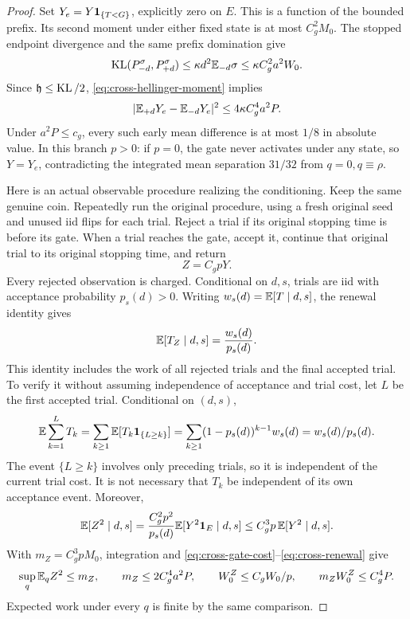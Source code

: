 \begin{proof}
Set \(Y_e=Y\mathbf 1_{\{T<G\}}\), explicitly zero on \(E\).
This is a function of the bounded prefix.
Its second moment under either fixed state is at most \(C_g^2M_0\).
The stopped endpoint divergence and the same prefix domination give
\[
 \operatorname{KL}(P_{-d}^{\sigma},P_{+d}^{\sigma})
 \le\kappa d^2\mathbb E_{-d}\sigma
 \le\kappa C_g^2a^2W_0.
\]
Since \(\mathfrak h\le\operatorname{KL}/2\), \eqref{eq:cross-hellinger-moment} implies
\begin{equation}
 |\mathbb E_{+d}Y_e-\mathbb E_{-d}Y_e|^2
 \le4\kappa C_g^4a^2P.
 \label{eq:cross-early-output}
\end{equation}
Under \(a^2P\le c_g\), every such early mean difference is at most
\(1/8\) in absolute value.  In this branch \(p>0\): if \(p=0\), the
gate never activates under any state, so \(Y=Y_e\), contradicting
the integrated mean separation \(31/32\) from \(q=0,q\equiv\rho\).

Here is an actual observable procedure realizing the conditioning.
Keep the same genuine coin.  Repeatedly run the original procedure,
using a fresh original seed and unused iid flips for each trial.
Reject a trial if its original stopping time is before its gate.
When a trial reaches the gate, accept it, continue that original trial
to its original stopping time, and return
\[
 Z=C_gpY.
\]
Every rejected observation is charged.  Conditional on \(d,s\), trials
are iid with acceptance probability \(p_s(d)>0\).
Writing \(w_s(d)=\mathbb E[T\mid d,s]\), the renewal identity gives
\begin{equation}
 \mathbb E[T_Z\mid d,s]=\frac{w_s(d)}{p_s(d)}.
 \label{eq:cross-renewal}
\end{equation}
This identity includes the work of all rejected trials and the final
accepted trial. To verify it without assuming independence of acceptance
and trial cost, let $L$ be the first accepted trial. Conditional on $(d,s)$,
\[
 \mathbb E\sum_{k=1}^{L}T_k
 =\sum_{k\ge1}\mathbb E[T_k\mathbf1_{\{L\ge k\}}]
 =\sum_{k\ge1}(1-p_s(d))^{k-1}w_s(d)
 =w_s(d)/p_s(d).
\]
The event $\{L\ge k\}$ involves only preceding trials, so it is independent
of the current trial cost. It is not necessary that $T_k$ be independent
of its own acceptance event. Moreover,
\[
 \mathbb E[Z^2\mid d,s]
 =\frac{C_g^2p^2}{p_s(d)}\mathbb E[Y^2\mathbf 1_E\mid d,s]
 \le C_g^3p\,\mathbb E[Y^2\mid d,s].
\]
With \(m_Z=C_g^3pM_0\), integration and
\eqref{eq:cross-gate-cost}--\eqref{eq:cross-renewal} give
\begin{equation}
 \sup_q\mathbb E_qZ^2\le m_Z,\qquad
 m_Z\le2C_g^4a^2P,\qquad
 W_0^Z\le C_gW_0/p,\qquad
 m_ZW_0^Z\le C_g^4P.
 \label{eq:cross-gate-moments}
\end{equation}
Expected work under every \(q\) is finite by the same comparison.


\end{proof}
